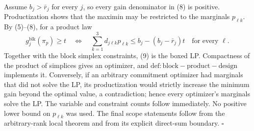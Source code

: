 Assume \(b_j>\bar r_j\) for every \(j\), so every gain denominator in (8) is positive.  Productization shows that the maximin may be restricted to the marginals \(p_{\ell k}\).  By (5)--(8), for a product law
\[
g_j^{\mathrm{blk}}(\pi_p)\ge t
\quad\Longleftrightarrow\quad
\sum_{k=1}^3d_{j\ell k}p_{\ell k}
\le b_j-(b_j-\bar r_j)t
\quad\text{for every }\ell. \tag{9}
\]
Together with the block simplex constraints, (9) is the boxed LP.  Compactness of the product of simplices gives an optimizer, and \(\mathrm{def:block-product-design}\) implements it.  Conversely, if an arbitrary commitment optimizer had marginals that did not solve the LP, its productization would strictly increase the minimum gain beyond the optimal value, a contradiction; hence every optimizer's marginals solve the LP.  The variable and constraint counts follow immediately.  No positive lower bound on \(p_{\ell k}\) was used.  The final scope statements follow from the arbitrary-rank local theorem and from its explicit direct-sum boundary. \(\square\)